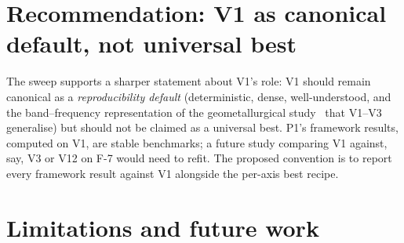 \documentclass[journal,a4paper,10pt]{IEEEtran}
\begin{document}
\section{Recommendation: V1 as canonical default, not universal best}
\label{sec:recommendation}

The sweep supports a sharper statement about V1's
role: V1 should remain canonical as a \emph{reproducibility default}
(deterministic, dense, well-understood, and the band--frequency
representation of the geometallurgical study~\cite{santibanezleal2022procemin}
that V1--V3 generalise) but should not be claimed as a universal best. P1's
framework results, computed on V1, are stable benchmarks; a future
study comparing V1 against, say, V3 or V12 on F-7 would need to refit.
The proposed convention is to report every framework result against
V1 alongside the per-axis best recipe.

\section{Limitations and future work}\label{sec:limitations}
\end{document}
